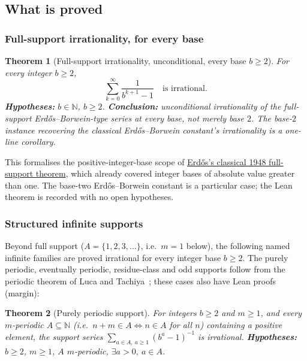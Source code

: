 \documentclass[11pt]{article}
\theoremstyle{plain}
\newtheorem{thm}{Theorem}[section]
\theoremstyle{definition}
\theoremstyle{remark}
\begin{document}
\subsection{What is proved}

\subsubsection{Full-support irrationality, for every base}

\begin{thm}[Full-support irrationality, unconditional, every base $b \ge 2$]
\label{thm:full-support}
For every integer $b \ge 2$,
\[
\sum_{k=0}^{\infty} \frac{1}{b^{k+1}-1} \quad \text{is irrational.}
\]
\textbf{Hypotheses:} $b \in \mathbb{N}$, $b \ge 2$. \textbf{Conclusion:} unconditional irrationality
of the full-support Erd\H{o}s--Borwein-type series at every base, not merely base $2$.
The base-$2$ instance recovering the classical Erd\H{o}s--Borwein constant's irrationality
is a one-line corollary.
\end{thm}

This formalises the positive-integer-base scope of
\href{https://www.renyi.hu/~p_erdos/1948-04.pdf}{Erd\H{o}s's classical 1948 full-support theorem},
which already covered integer bases of absolute value greater than one. The base-two
Erd\H{o}s--Borwein constant is a particular case; the Lean theorem is recorded with no open
hypotheses.

\subsubsection{Structured infinite supports}

Beyond full support ($A = \{1,2,3,\dots\}$, i.e.\ $m=1$ below), the following named infinite
families are proved irrational for every integer base $b\ge2$.  The purely
periodic, eventually periodic, residue-class and odd supports follow from the periodic theorem of
Luca and Tachiya~\cite[Theorem~A, p.~139]{lucatachiya2017}; these cases also have Lean proofs
(margin):

\begin{thm}[Purely periodic support]\label{thm:purely-periodic-support}
For integers $b\ge2$ and $m\ge1$, and every $m$-periodic $A\subseteq\mathbb N$ (i.e.\
$n+m \in A \Leftrightarrow n \in A$ for all $n$) containing a positive element, the support series
$\sum_{a\in A,\ a\ge1}(b^a-1)^{-1}$ is irrational. \textbf{Hypotheses:} $b \ge 2$, $m \ge 1$, $A$
$m$-periodic, $\exists a > 0,\ a \in A$.
\end{thm}
\end{document}

